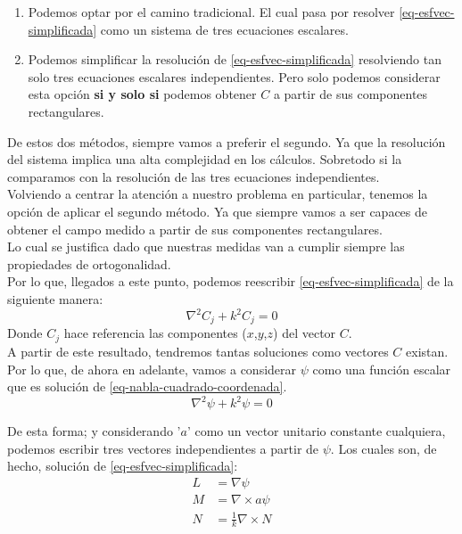 \documentclass{article}
\begin{document}
\begin{enumerate}
    \item Podemos optar por el camino tradicional. El cual pasa por resolver \eqref{eq-esfvec-simplificada} como un sistema de tres ecuaciones escalares.
    \item Podemos simplificar la resolución de \eqref{eq-esfvec-simplificada} resolviendo tan solo tres ecuaciones escalares independientes. Pero solo podemos considerar esta opción \textbf{si y solo si} podemos obtener $C$ a partir de sus componentes rectangulares.
\end{enumerate}

De estos dos métodos, siempre vamos a preferir el segundo. Ya que la resolución del sistema implica una alta complejidad en los cálculos. Sobretodo si la comparamos con la resolución de las tres ecuaciones independientes. \\

Volviendo a centrar la atención a nuestro problema en particular, tenemos la opción de aplicar el segundo método. Ya que siempre vamos a ser capaces de obtener el campo medido a partir de sus componentes rectangulares.\\
Lo cual se justifica dado que nuestras medidas van a cumplir siempre las propiedades de ortogonalidad.\\

Por lo que, llegados a este punto, podemos reescribir \eqref{eq-esfvec-simplificada} de la siguiente manera:
\begin{equation}
\nabla^2C_{j} + k^2C_{j} = 0
\label{eq-nabla-cuadrado-coordenada}
\end{equation}
Donde $C_{j}$ hace referencia las componentes ($x$,$y$,$z$) del vector $C$.\\
\newpage
A partir de este resultado, tendremos tantas soluciones como vectores $C$ existan. Por lo que, de ahora en adelante, vamos a considerar $\psi$ como una función escalar que es solución de \eqref{eq-nabla-cuadrado-coordenada}.\\
\begin{equation}
\nabla^2\psi + k^2\psi = 0
\label{eq-nabla-cuadrado-coordenada-con-una-soculicon-por-vector-C}
\end{equation}

De esta forma; y considerando  '$a$' como un vector unitario constante cualquiera, podemos escribir tres vectores independientes a partir de $\psi$. Los cuales son, de hecho, solución de \eqref{eq-esfvec-simplificada}:
\begin{subequations}
\begin{align}
    L&= \nabla\psi \label{eq:Lirrotacional}\\
    M&= \nabla\times a\psi\\
    N&=\frac{1}{k}\nabla\times N
\end{align}
\end{subequations}
\end{document}
